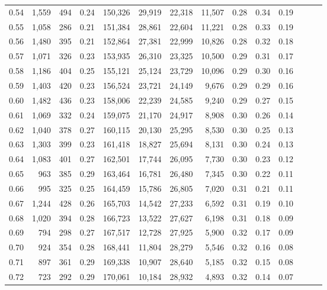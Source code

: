 \begin{tabular}{rrrrrrrrrrrrrr}
0.54 &  1,559 &  494 &  0.24 &  150,326 &   29,919 &  22,318 &  11,507 &  0.28 &  0.34 &      0.19 \\
0.55 &  1,058 &  286 &  0.21 &  151,384 &   28,861 &  22,604 &  11,221 &  0.28 &  0.33 &      0.19 \\
0.56 &  1,480 &  395 &  0.21 &  152,864 &   27,381 &  22,999 &  10,826 &  0.28 &  0.32 &      0.18 \\
0.57 &  1,071 &  326 &  0.23 &  153,935 &   26,310 &  23,325 &  10,500 &  0.29 &  0.31 &      0.17 \\
0.58 &  1,186 &  404 &  0.25 &  155,121 &   25,124 &  23,729 &  10,096 &  0.29 &  0.30 &      0.16 \\
0.59 &  1,403 &  420 &  0.23 &  156,524 &   23,721 &  24,149 &   9,676 &  0.29 &  0.29 &      0.16 \\
0.60 &  1,482 &  436 &  0.23 &  158,006 &   22,239 &  24,585 &   9,240 &  0.29 &  0.27 &      0.15 \\
0.61 &  1,069 &  332 &  0.24 &  159,075 &   21,170 &  24,917 &   8,908 &  0.30 &  0.26 &      0.14 \\
0.62 &  1,040 &  378 &  0.27 &  160,115 &   20,130 &  25,295 &   8,530 &  0.30 &  0.25 &      0.13 \\
0.63 &  1,303 &  399 &  0.23 &  161,418 &   18,827 &  25,694 &   8,131 &  0.30 &  0.24 &      0.13 \\
0.64 &  1,083 &  401 &  0.27 &  162,501 &   17,744 &  26,095 &   7,730 &  0.30 &  0.23 &      0.12 \\
0.65 &    963 &  385 &  0.29 &  163,464 &   16,781 &  26,480 &   7,345 &  0.30 &  0.22 &      0.11 \\
0.66 &    995 &  325 &  0.25 &  164,459 &   15,786 &  26,805 &   7,020 &  0.31 &  0.21 &      0.11 \\
0.67 &  1,244 &  428 &  0.26 &  165,703 &   14,542 &  27,233 &   6,592 &  0.31 &  0.19 &      0.10 \\
0.68 &  1,020 &  394 &  0.28 &  166,723 &   13,522 &  27,627 &   6,198 &  0.31 &  0.18 &      0.09 \\
0.69 &    794 &  298 &  0.27 &  167,517 &   12,728 &  27,925 &   5,900 &  0.32 &  0.17 &      0.09 \\
0.70 &    924 &  354 &  0.28 &  168,441 &   11,804 &  28,279 &   5,546 &  0.32 &  0.16 &      0.08 \\
0.71 &    897 &  361 &  0.29 &  169,338 &   10,907 &  28,640 &   5,185 &  0.32 &  0.15 &      0.08 \\
0.72 &    723 &  292 &  0.29 &  170,061 &   10,184 &  28,932 &   4,893 &  0.32 &  0.14 &      0.07 \\

\end{tabular}
